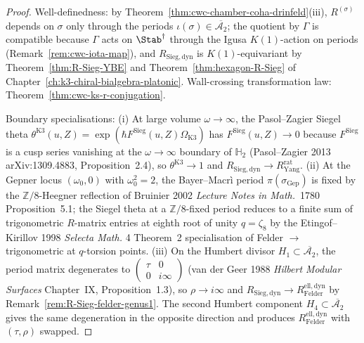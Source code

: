 \begin{proof}
Well-definedness: by
Theorem~\ref{thm:cwc-chamber-coha-drinfeld}(iii), $R^{(\sigma)}$
depends on $\sigma$ only through the periods
$\iota(\sigma)\in\overline{\mathcal{A}_2}$; the quotient by $\Gamma$ is
compatible because $\Gamma$ acts on $\Stab^\dagger$ through the Igusa
$K(1)$-action on periods (Remark~\ref{rem:cwc-iota-map}), and
$R_{\mathrm{Sieg,dyn}}$ is $K(1)$-equivariant by
Theorem~\ref{thm:R-Sieg-YBE} and
Theorem~\ref{thm:hexagon-R-Sieg} of
Chapter~\ref{ch:k3-chiral-bialgebra-platonic}. Wall-crossing transformation
law: Theorem~\ref{thm:cwc-ks-r-conjugation}.

Boundary specialisations:
(i) At large volume $\omega\to\infty$, the Pasol--Zagier Siegel
theta $\theta^{\mathrm{K3}}(u,Z)=\exp(\hbar F^{\mathrm{Sieg}}(u,Z)
\Omega_{\mathrm{K3}})$ has $F^{\mathrm{Sieg}}(u,Z)\to 0$ because
$F^{\mathrm{Sieg}}$ is a cusp series vanishing at the $\omega\to\infty$
boundary of $\mathbb{H}_2$ (Pasol--Zagier 2013 \textup{arXiv:1309.4883},
Proposition~2.4), so $\theta^{\mathrm{K3}}\to 1$ and
$R_{\mathrm{Sieg,dyn}}\to R^{\mathrm{rat}}_{\mathrm{Yang}}$.
(ii) At the Gepner locus $(\omega_0,0)$ with $\omega_0^2=2$, the
Bayer--Macr\`i period $\pi(\sigma_{\mathrm{Gep}})$ is fixed by the
$\mathbb{Z}/8$-Heegner reflection of Bruinier 2002 \emph{Lecture Notes
in Math.}~1780 Proposition~5.1; the Siegel theta at a
$\mathbb{Z}/8$-fixed period reduces to a finite sum of trigonometric
$R$-matrix entries at eighth root of unity $q=\zeta_8$ by the
Etingof--Kirillov 1998 \emph{Selecta Math.} 4 Theorem~2 specialisation
of Felder $\to$ trigonometric at $q$-torsion points.
(iii) On the Humbert divisor $H_1\subset\overline{\mathcal{A}_2}$, the
period matrix degenerates to
$\begin{pmatrix}\tau & 0\\ 0 & i\infty\end{pmatrix}$
(van der Geer 1988 \emph{Hilbert Modular Surfaces} Chapter~IX,
Proposition~1.3), so $\rho\to i\infty$ and
$R_{\mathrm{Sieg,dyn}}\to R^{\mathrm{ell,dyn}}_{\mathrm{Felder}}$ by
Remark~\ref{rem:R-Sieg-felder-genus1}. The second Humbert component
$H_4\subset\overline{\mathcal{A}_2}$ gives the same degeneration in the
opposite direction and produces $R^{\mathrm{ell,dyn}}_{\mathrm{Felder}}$
with $(\tau,\rho)$ swapped.
\end{proof}

